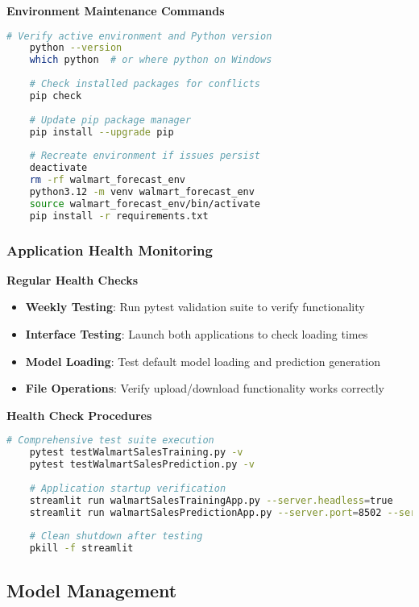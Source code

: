 \textbf{Environment Maintenance Commands}
\begin{lstlisting}[language=bash,basicstyle=\color{blue}]
	# Verify active environment and Python version
	python --version
	which python  # or where python on Windows
	
	# Check installed packages for conflicts
	pip check
	
	# Update pip package manager
	pip install --upgrade pip
	
	# Recreate environment if issues persist
	deactivate
	rm -rf walmart_forecast_env
	python3.12 -m venv walmart_forecast_env
	source walmart_forecast_env/bin/activate
	pip install -r requirements.txt
\end{lstlisting}



\subsubsection{Application Health Monitoring}

\textbf{Regular Health Checks}
\begin{itemize}
	\item \textbf{Weekly Testing}: Run pytest validation suite to verify functionality
	\item \textbf{Interface Testing}: Launch both applications to check loading times
	\item \textbf{Model Loading}: Test default model loading and prediction generation
	\item \textbf{File Operations}: Verify upload/download functionality works correctly
\end{itemize}

\textbf{Health Check Procedures}
\begin{lstlisting}[language=bash]
	# Comprehensive test suite execution
	pytest testWalmartSalesTraining.py -v
	pytest testWalmartSalesPrediction.py -v
	
	# Application startup verification
	streamlit run walmartSalesTrainingApp.py --server.headless=true
	streamlit run walmartSalesPredictionApp.py --server.port=8502 --server.headless=true
	
	# Clean shutdown after testing
	pkill -f streamlit
\end{lstlisting}

\subsection{Model Management}

